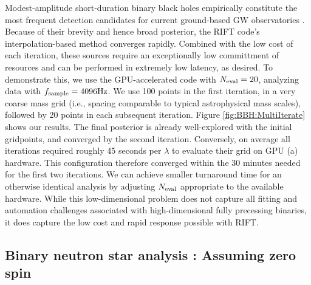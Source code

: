\documentclass[twocolumn,prd,nofootinbib]{revtex4}
\newcommand\unit[1]{{\rm #1}}
\begin{document}
Modest-amplitude short-duration binary black holes empirically constitute the most frequent detection candidates
for current ground-based GW observatories \cite{LIGO-O2-Catalog}.    Because of their brevity and hence broad posterior,
the RIFT code's interpolation-based method converges  rapidly.  Combined with the low cost of each iteration,
these sources require an exceptionally low committment of resources and can be performed in extremely low latency, as
desired.
To demonstrate this, we use the GPU-accelerated code with $N_{\rm eval}=20$, analyzing data with $f_{\rm
  sample}=4096\unit{Hz}$.    We use 100 points in the first iteration, in a very coarse mass  grid (i.e., spacing
comparable to typical astrophysical mass scales), followed by 20 points in each subsequent iteration.  Figure \ref{fig:BBH:MultiIterate} shows our results.   The
final posterior is already well-explored with the initial gridpoints, and converged by the second iteration.  
Conversely, on average all iterations required roughly 45 seconds per $\lambda$ to evaluate their grid on GPU (a) hardware.  This
configuration therefore converged within the 30 minutes needed for the first two iterations.    We can achieve  smaller turnaround time for an otherwise identical analysis by adjusting $N_{\rm eval}$ appropriate to the available hardware.
%
While this low-dimensional problem does not capture all  fitting and automation challenges associated with high-dimensional
 fully precessing binaries, it does capture the low cost and rapid response possible with RIFT.






\subsection{Binary neutron star analysis : Assuming  zero spin}
\label{sec:sub:BNSFull}
\end{document}
